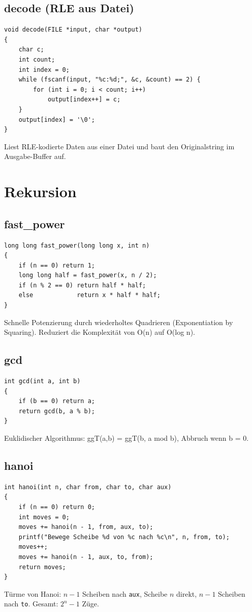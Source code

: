 \documentclass[10pt, a4paper]{article}
\begin{document}
\subsection{decode (RLE aus Datei)}
\begin{lstlisting}
void decode(FILE *input, char *output)
{
    char c;
    int count;
    int index = 0;
    while (fscanf(input, "%c:%d;", &c, &count) == 2) {
        for (int i = 0; i < count; i++)
            output[index++] = c;
    }
    output[index] = '\0';
}
\end{lstlisting}
Liest RLE-kodierte Daten aus einer Datei und baut den Originalstring im Ausgabe-Buffer auf.

\newpage
\section{Rekursion}

\subsection{fast\_power}
\begin{lstlisting}
long long fast_power(long long x, int n)
{
    if (n == 0) return 1;
    long long half = fast_power(x, n / 2);
    if (n % 2 == 0) return half * half;
    else            return x * half * half;
}
\end{lstlisting}
Schnelle Potenzierung durch wiederholtes Quadrieren (Exponentiation by Squaring). Reduziert die Komplexit\"at von O(n) auf O(log n).

\subsection{gcd}
\begin{lstlisting}
int gcd(int a, int b)
{
    if (b == 0) return a;
    return gcd(b, a % b);
}
\end{lstlisting}
Euklidischer Algorithmus: ggT(a,b) = ggT(b, a mod b), Abbruch wenn b = 0.

\subsection{hanoi}
\begin{lstlisting}
int hanoi(int n, char from, char to, char aux)
{
    if (n == 0) return 0;
    int moves = 0;
    moves += hanoi(n - 1, from, aux, to);
    printf("Bewege Scheibe %d von %c nach %c\n", n, from, to);
    moves++;
    moves += hanoi(n - 1, aux, to, from);
    return moves;
}
\end{lstlisting}
T\"urme von Hanoi: $n-1$ Scheiben nach \texttt{aux}, Scheibe $n$ direkt, $n-1$ Scheiben nach \texttt{to}. Gesamt: $2^n - 1$ Z\"uge.
\end{document}
